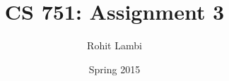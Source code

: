 \documentclass[letterpaper]{report}
\begin{document}
\renewcommand{\thesection}{\arabic{section}}


\newcommand{\hmwkTitle}{Assignment\ \3}
\newcommand{\assignmentDescription}{}
\newcommand{\hmwkDueDate}{Friday,\ April 03,\ 2015} 
\newcommand{\hmwkClass}{CS\ 751} 
\newcommand{\hmwkAuthorName}{Rohit Lambi <rlambi>}


\author{Rohit Lambi}
\title{CS 751: Assignment 3 \\
\normalsize\vspace{0.1in}\large{\assignmentDescription}
}

\date{Spring 2015}

\maketitle

\tableofcontents
\newpage







\nocite{*}
\end{document}
